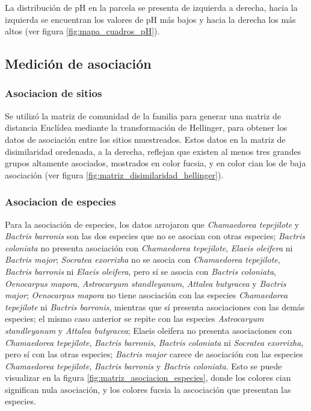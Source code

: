 \documentclass[11pt,]{article}
\begin{document}
La distribución de pH en la parcela se presenta de izquierda a derecha,
hacia la izquierda se encuentran los valores de pH más bajos y hacia la
derecha los más altos (ver figura \ref{fig:mapa_cuadros_pH}).

\subsection{Medición de asociación}\label{mediciuxf3n-de-asociaciuxf3n}

\subsubsection{Asociacion de sitios}\label{asociacion-de-sitios}

Se utilizó la matriz de comunidad de la familia para generar una matriz
de distancia Euclídea mediante la transformación de Hellinger, para
obtener los datos de asociación entre los sitios muestreados. Estos
datos en la matriz de disimilaridad oredenada, a la derecha, reflejan
que existen al menos tres grandes grupos altamente asociados, mostrados
en color fucsia, y en color cian los de baja asociación (ver figura
\ref{fig:matriz_disimilaridad_hellinger}).

\subsubsection{Asociacion de especies}\label{asociacion-de-especies}

Para la asociación de especies, los datos arrojaron que
\emph{Chamaedorea tepejilote} y \emph{Bactris barronis} son las dos
especies que no se asocian con otras especies; \emph{Bactris coloniata}
no presenta asociación con \emph{Chamaedorea tepejilote}, \emph{Elaeis
oleifera} ni \emph{Bactris major}; \emph{Socratea exorrizha} no se
asocia con \emph{Chamaedorea tepejilote}, \emph{Bactris barronis} ni
\emph{Elaeis oleifera}, pero sí se asocia con \emph{Bactris coloniata},
\emph{Oenocarpus mapora}, \emph{Astrocaryum standleyanum}, \emph{Attalea
butyracea} y \emph{Bactris major}; \emph{Oenocarpus mapora} no tiene
asociación con las especies \emph{Chamaedorea tepejilote} ni
\emph{Bactris barronis}, mientras que sí presenta asociaciones con las
demás especies; el mismo caso anterior se repite con las especies
\emph{Astrocaryum standleyanum} y \emph{Attalea butyracea}; Elaeis
oleifera no presenta asociaciones con \emph{Chamaedorea tepejilote},
\emph{Bactris barronis}, \emph{Bactris coloniata} ni \emph{Socratea
exorrizha}, pero sí con las otras especies; \emph{Bactris major} carece
de asociación con las especies \emph{Chamaedorea tepejilote},
\emph{Bactris barronis} y \emph{Bactris coloniata}. Esto se puede
visualizar en la figura \ref{fig:matriz_asociacion_especies}, donde los
colores cian significan nula asociación, y los colores fucsia la
ascociación que presentan las especies.
\end{document}
